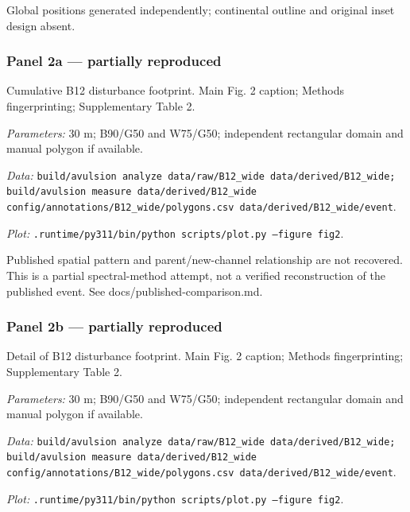 Global positions generated independently; continental outline and original inset design absent.

\subsubsection*{Panel 2a --- partially reproduced}
Cumulative B12 disturbance footprint. Main Fig. 2 caption; Methods fingerprinting; Supplementary Table 2.

\textit{Parameters:} 30 m; B90/G50 and W75/G50; independent rectangular domain and manual polygon if available.

\textit{Data:} \texttt{build/\allowbreak{}avulsion analyze data/\allowbreak{}raw/\allowbreak{}B12\_wide data/\allowbreak{}derived/\allowbreak{}B12\_wide; build/\allowbreak{}avulsion measure data/\allowbreak{}derived/\allowbreak{}B12\_wide config/\allowbreak{}annotations/\allowbreak{}B12\_wide/\allowbreak{}polygons.csv data/\allowbreak{}derived/\allowbreak{}B12\_wide/\allowbreak{}event}.

\textit{Plot:} \texttt{.runtime/\allowbreak{}py311/\allowbreak{}bin/\allowbreak{}python scripts/\allowbreak{}plot.py --figure fig2}.

Published spatial pattern and parent/new-channel relationship are not recovered. This is a partial spectral-method attempt, not a verified reconstruction of the published event. See docs/published-comparison.md.

\subsubsection*{Panel 2b --- partially reproduced}
Detail of B12 disturbance footprint. Main Fig. 2 caption; Methods fingerprinting; Supplementary Table 2.

\textit{Parameters:} 30 m; B90/G50 and W75/G50; independent rectangular domain and manual polygon if available.

\textit{Data:} \texttt{build/\allowbreak{}avulsion analyze data/\allowbreak{}raw/\allowbreak{}B12\_wide data/\allowbreak{}derived/\allowbreak{}B12\_wide; build/\allowbreak{}avulsion measure data/\allowbreak{}derived/\allowbreak{}B12\_wide config/\allowbreak{}annotations/\allowbreak{}B12\_wide/\allowbreak{}polygons.csv data/\allowbreak{}derived/\allowbreak{}B12\_wide/\allowbreak{}event}.

\textit{Plot:} \texttt{.runtime/\allowbreak{}py311/\allowbreak{}bin/\allowbreak{}python scripts/\allowbreak{}plot.py --figure fig2}.

